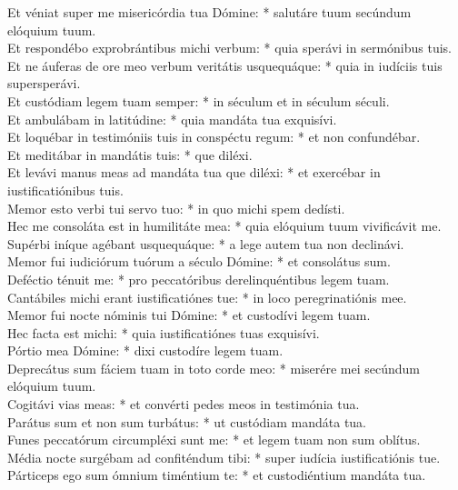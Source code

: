 {	Et véniat super me misericórdia tua Dómine: * salutáre tuum secúndum elóquium tuum. \\
	Et respondébo exprobrántibus michi verbum: * quia sperávi in sermónibus tuis. \\
	Et ne áuferas de ore meo verbum veritátis usquequáque: * quia in iudíciis tuis supersperávi. \\
	Et custódiam legem tuam semper: * in séculum et in séculum séculi. \\
	Et ambulábam in latitúdine: * quia mandáta tua exquisívi. \\
	Et loquébar in testimóniis tuis in conspéctu regum: * et non confundébar. \\
	Et meditábar in mandátis tuis: * que diléxi. \\
	Et levávi manus meas ad mandáta tua que diléxi: * et exercébar in iustificatiónibus tuis. \\
	Memor esto verbi tui servo tuo: * in quo michi spem dedísti. \\
	Hec me consoláta est in humilitáte mea: * quia elóquium tuum vivificávit me. \\
	Supérbi iníque agébant usquequáque: * a lege autem tua non declinávi. \\
	Memor fui iudiciórum tuórum a século Dómine: * et consolátus sum. \\
	Deféctio ténuit me: * pro peccatóribus derelinquéntibus legem tuam. \\
	Cantábiles michi erant iustificatiónes tue: * in loco peregrinatiónis mee. \\
	Memor fui nocte nóminis tui Dómine: * et custodívi legem tuam. \\
	Hec facta est michi: * quia iustificatiónes tuas exquisívi. \\
	Pórtio mea Dómine: * dixi custodíre legem tuam. \\
	Deprecátus sum fáciem tuam in toto corde meo: * miserére mei secúndum elóquium tuum. \\
	Cogitávi vias meas: * et convérti pedes meos in testimónia tua. \\
	Parátus sum et non sum turbátus: * ut custódiam mandáta tua. \\
	Funes peccatórum circumpléxi sunt me: * et legem tuam non sum oblítus. \\
	Média nocte surgébam ad confiténdum tibi: * super iudícia iustificatiónis tue. \\
	Párticeps ego sum ómnium timéntium te: * et custodiéntium mandáta tua. \\
}
